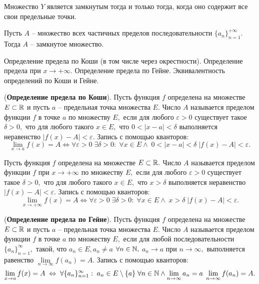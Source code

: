 \begin{lemma}
	Множество $Y$ является замкнутым тогда
	и только тогда, когда оно содержит
	все свои предельные точки.
\end{lemma}


\begin{lemma}
	Пусть $A$ -- множество всех частичных
	пределов последовательности
	$\{a_n\}_{n=1}^{+\infty}.$ Тогда
	$A$ -- замкнутое множество.
\end{lemma}
\newpage
\begin{problem}
Определение предела по Коши (в том числе через окрестности). Определение предела
при $x \to +\infty$. Определение предела по Гейне. Эквивалентность определений по Коши и
Гейне.
\end{problem}

\begin{definition}
	(\textbf{Определение предела по Коши}).
	Пусть функция $f$ определена на множестве
	$E\subset\mathbb{R}$ и пусть $a$ -- предельная
	точка множества $E.$ Число $A$ называется
	пределом функции $f$ в точке $a$ по множеству
	$E,$ если для любого $\varepsilon>0$
	существует такое $\delta>0,$ что
	для любого такого $x\in E,$ что
	$0<|x-a|<\delta$
	выполняется неравенство $|f(x)-A|<\varepsilon.$
	Запись с помощью кванторов:
	$$
		\lim\limits_{x\rightarrow a}f(x)=A\Leftrightarrow
		\forall\varepsilon>0\;\exists\delta>0:\;
		\forall x \in E\wedge\;0<|x-a|<\delta\;
		|f(x)-A|<\varepsilon.
	$$
\end{definition}

\begin{definition}
	Пусть функция $f$ определена на множестве
	$E\subset\mathbb{R}.$ Число $A$ называется
	пределом функции $f$ при
	$x\rightarrow+\infty$ по множеству
	$E,$ если для любого $\varepsilon>0$
	существует такое $\delta>0,$ что
	для любого такого $x\in E,$ что
	$x>\delta$
	выполняется неравенство $|f(x)-A|<\varepsilon.$
	Запись с помощью кванторов:
	$$
		\lim\limits_{x\rightarrow +\infty}f(x)=A\Leftrightarrow
		\forall\varepsilon>0\;\exists\delta>0:\;
		\forall x \in E\wedge\;x>\delta\;
		|f(x)-A|<\varepsilon.
	$$
\end{definition}

\begin{definition}
	(\textbf{Определение предела по Гейне}).
	Пусть функция $f$ определена на множестве
	$E\subset\mathbb{R}$ и пусть $a$ -- предельная
	точка множества $E.$ Число $A$ называется
	пределом функции $f$ в точке $a$ по множеству
	$E,$ если для любой последовательности
	$\{a_n\}_{n=1}^{\infty},$ такой, что
	$a_n \in E, a_n\neq a$
	$\forall n \in \mathbb{N},$ $a_n\rightarrow a$
	при $n\rightarrow\infty,$
	выполняется равенство $\lim
		\limits_{n\rightarrow\infty}f(a_n)=A.$
	Запись с помощью кванторов:
	$$
		\lim\limits_{x\rightarrow a}f(x)=A\;\Leftrightarrow\;
		\forall \{a_n\}_{n=1}^{\infty}:\;
		a_n \in E\setminus\{a\}\;\forall n \in \mathbb{N}\wedge
		\lim\limits_{n\rightarrow\infty}a_n=a\;
		\lim\limits_{n\rightarrow\infty}f(a_n)=A.
	$$
\end{definition}

